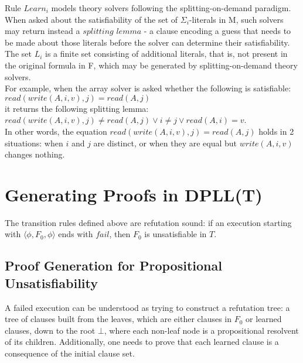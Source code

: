 \documentclass{article}
\begin{document}
Rule $Learn_i$ models theory solvers following the 
splitting-on-demand paradigm. When asked about the satisfiability of 
the set of $\Sigma_i$-literals in M, such solvers may return instead 
a $\textit{splitting lemma}$ - a clause encoding a guess that needs 
to be made about those literals before the solver can determine 
their satisfiability. The set $L_i$ is a finite set consisting of 
additional literals, that is, not present in the original formula 
in F, which may be generated by splitting-on-demand theory solvers.\\
For example, when the array solver is asked whether the following is
satisfiable:\\
$read(write(A,i,v),j) = read(A,j)$\\
it returns the following splitting lemma:\\
$read(write(A,i,v),j) \neq read(A,j) \lor i \neq j 
\lor read(A,i) = v$.\\
In other words, the equation $read(write(A,i,v),j)=read(A,j)$ holds
in 2 situations: when $i$ and $j$ are distinct, or when they are
equal but $write(A,i,v)$ changes nothing.

\section{Generating Proofs in DPLL(T)}
The transition rules defined above are refutation sound: if an 
execution starting with $\langle \phi, F_0, \phi \rangle$ ends with 
$fail$, then $F_0$ is unsatisfiable in $T$.

\subsection{Proof Generation for Propositional Unsatisfiability}
A failed execution can be understood as trying to construct a 
refutation tree: a tree of clauses built from the leaves,
which are either clauses in $F_0$ or learned clauses, down to
the root $\bot$, where each non-leaf node is a 
propositional resolvent of its children. Additionally, one
needs to prove that each learned clause is a consequence of 
the initial clause set.
\end{document}
